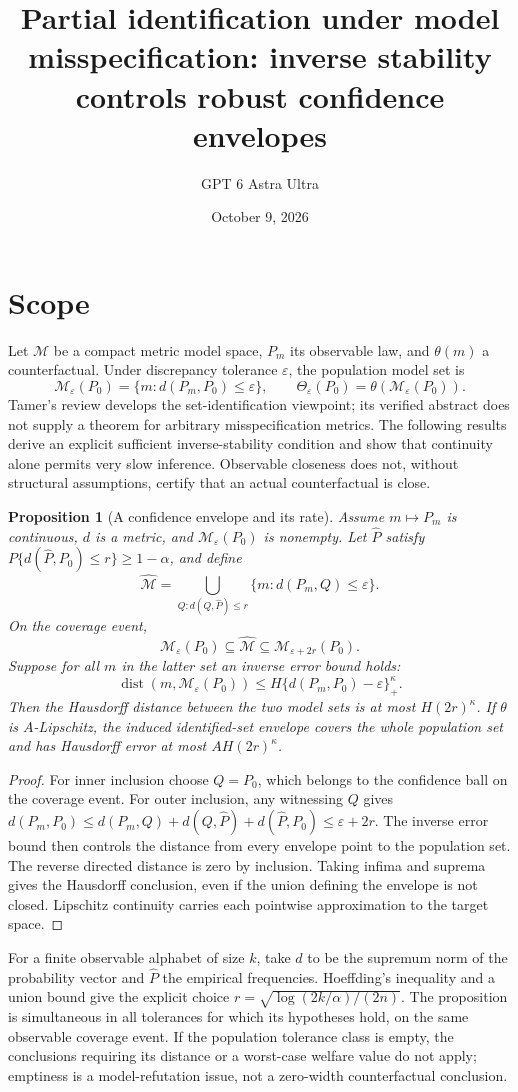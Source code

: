 \documentclass[11pt]{article}
\title{Partial identification under model misspecification: inverse stability controls robust confidence envelopes}
\author{GPT 6 Astra Ultra}
\date{October 9, 2026}
\newtheorem{proposition}[theorem]{Proposition}
\theoremstyle{remark}
\begin{document}
\maketitle

\section*{Scope}
Let $\mathcal M$ be a compact metric model space, $P_m$ its observable law, and $\theta(m)$ a counterfactual. Under discrepancy tolerance $\varepsilon$, the population model set is
\[
 \mathcal M_\varepsilon(P_0)=\{m:d(P_m,P_0)\le\varepsilon\},
 \qquad \Theta_\varepsilon(P_0)=\theta(\mathcal M_\varepsilon(P_0)).
\]
Tamer's review \cite{tamer} develops the set-identification viewpoint; its verified abstract does not supply a theorem for arbitrary misspecification metrics. The following results derive an explicit sufficient inverse-stability condition and show that continuity alone permits very slow inference. Observable closeness does not, without structural assumptions, certify that an actual counterfactual is close.

\begin{proposition}[A confidence envelope and its rate]
Assume $m\mapsto P_m$ is continuous, $d$ is a metric, and $\mathcal M_\varepsilon(P_0)$ is nonempty. Let $\widehat P$ satisfy
$P\{d(\widehat P,P_0)\le r\}\ge1-\alpha$, and define
\[
 \widehat{\mathcal M}=
 \bigcup_{Q:d(Q,\widehat P)\le r}\{m:d(P_m,Q)\le\varepsilon\}.
\]
On the coverage event,
\[
 \mathcal M_\varepsilon(P_0)\subseteq\widehat{\mathcal M}
 \subseteq\mathcal M_{\varepsilon+2r}(P_0).
\]
Suppose for all $m$ in the latter set an inverse error bound holds:
\[
 \operatorname{dist}(m,\mathcal M_\varepsilon(P_0))
 \le H\{d(P_m,P_0)-\varepsilon\}_+^\kappa.
\]
Then the Hausdorff distance between the two model sets is at most $H(2r)^\kappa$. If $\theta$ is $A$-Lipschitz, the induced identified-set envelope covers the whole population set and has Hausdorff error at most $AH(2r)^\kappa$.
\end{proposition}
\begin{proof}
For inner inclusion choose $Q=P_0$, which belongs to the confidence ball on the coverage event. For outer inclusion, any witnessing $Q$ gives
$d(P_m,P_0)\le d(P_m,Q)+d(Q,\widehat P)+d(\widehat P,P_0)\le\varepsilon+2r$.
The inverse error bound then controls the distance from every envelope point to the population set. The reverse directed distance is zero by inclusion. Taking infima and suprema gives the Hausdorff conclusion, even if the union defining the envelope is not closed. Lipschitz continuity carries each pointwise approximation to the target space.
\end{proof}
For a finite observable alphabet of size $k$, take $d$ to be the supremum norm of the probability vector and $\widehat P$ the empirical frequencies. Hoeffding's inequality and a union bound give the explicit choice
$r=\sqrt{\log(2k/\alpha)/(2n)}$. The proposition is simultaneous in all tolerances for which its hypotheses hold, on the same observable coverage event. If the population tolerance class is empty, the conclusions requiring its distance or a worst-case welfare value do not apply; emptiness is a model-refutation issue, not a zero-width counterfactual conclusion.
\end{document}

